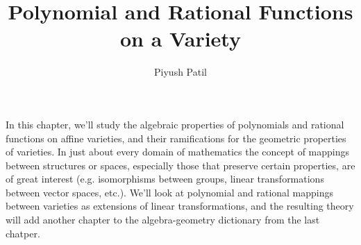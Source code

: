 \documentclass{article}
\begin{document}
\title{Polynomial and Rational Functions on a Variety}
\author{Piyush Patil}
\maketitle

In this chapter, we'll study the algebraic properties of polynomials and rational functions on affine varieties, and their ramifications for the geometric properties of varieties. In just about every domain of mathematics the concept of mappings between structures or spaces, especially those that preserve certain properties, are of great interest (e.g. isomorphisms between groups, linear transformations between vector spaces, etc.). We'll look at polynomial and rational mappings between varieties as extensions of linear transformations, and the resulting theory will add another chapter to the algebra-geometry dictionary from the last chatper.
\end{document}
